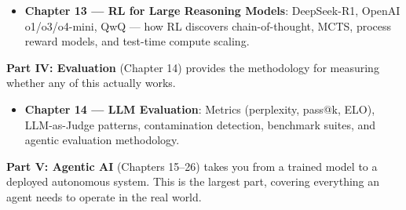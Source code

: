 \documentclass[11pt,a4paper,openany]{book}
\begin{document}
\begin{itemize}
  \item \textbf{Chapter 13 --- RL for Large Reasoning Models}: DeepSeek-R1, OpenAI o1/o3/o4-mini, QwQ --- how RL discovers chain-of-thought, MCTS, process reward models, and test-time compute scaling.
\end{itemize}

\textbf{Part IV: Evaluation} (Chapter 14) provides the methodology for measuring whether any of this actually works.

\begin{itemize}
  \item \textbf{Chapter 14 --- LLM Evaluation}: Metrics (perplexity, pass@k, ELO), LLM-as-Judge patterns, contamination detection, benchmark suites, and agentic evaluation methodology.
\end{itemize}

\textbf{Part V: Agentic AI} (Chapters 15--26) takes you from a trained model to a deployed autonomous system. This is the largest part, covering everything an agent needs to operate in the real world.
\end{document}

